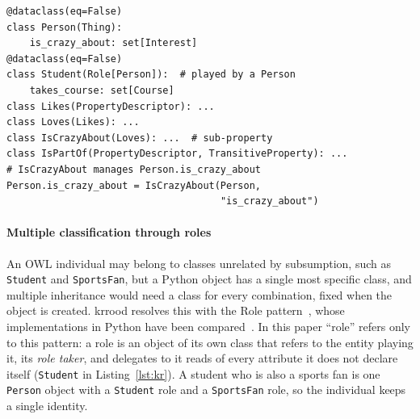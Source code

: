 \documentclass[sigconf,anonymous]{aamas}
\begin{document}
\begin{lstlisting}[style=eql, caption={Part of the running example. Classes are concepts, attributes are properties, and descriptor classes carry property semantics.}, label={lst:kr}]
@dataclass(eq=False)
class Person(Thing):
    is_crazy_about: set[Interest]
@dataclass(eq=False)
class Student(Role[Person]):  # played by a Person
    takes_course: set[Course]
class Likes(PropertyDescriptor): ...
class Loves(Likes): ...
class IsCrazyAbout(Loves): ...  # sub-property
class IsPartOf(PropertyDescriptor, TransitiveProperty): ...
# IsCrazyAbout manages Person.is_crazy_about
Person.is_crazy_about = IsCrazyAbout(Person,
                                     "is_crazy_about")
\end{lstlisting}

\paragraph{Multiple classification through roles}
An OWL individual may belong to classes unrelated by subsumption, such as \texttt{Student} and \texttt{SportsFan}, but a Python object has a single most specific class, and multiple inheritance would need a class for every combination, fixed when the object is created. \ac{krrood} resolves this with the Role pattern~\cite{steimann2000roles,Guarino2004,boella2007roles}, whose implementations in Python have been compared~\cite{bassiouny2026roles}. In this paper ``role'' refers only to this pattern: a role is an object of its own class that refers to the entity playing it, its \emph{role taker}, and delegates to it reads of every attribute it does not declare itself (\texttt{Student} in Listing~\ref{lst:kr}). A student who is also a sports fan is one \texttt{Person} object with a \texttt{Student} role and a \texttt{SportsFan} role, so the individual keeps a single identity.
\end{document}
